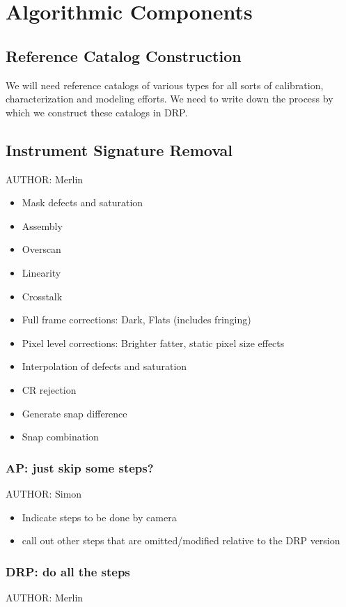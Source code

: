 \section{Algorithmic Components}
\label{sec:algorithmic-components}

\subsection{Reference Catalog Construction}
\label{sec:acReferenceCats}

We will need reference catalogs of various types for all sorts of calibration, characterization and modeling efforts.  We need to write down the process by which we construct these catalogs in DRP.

\subsection{Instrument Signature Removal}
\label{sec:acISR}
AUTHOR: Merlin
\begin{itemize}
\item Mask defects and saturation
\item Assembly
\item Overscan
\item Linearity
\item Crosstalk
\item Full frame corrections: Dark, Flats (includes fringing)
\item Pixel level corrections: Brighter fatter, static pixel size effects
\item Interpolation of defects and saturation
\item CR rejection
\item Generate snap difference
\item Snap combination
\end{itemize}

\subsubsection{AP: just skip some steps?}
AUTHOR: Simon
\begin{itemize}
\item Indicate steps to be done by camera
\item call out other steps that are omitted/modified relative to the DRP version
\end{itemize}

\subsubsection{DRP: do all the steps}
AUTHOR: Merlin


